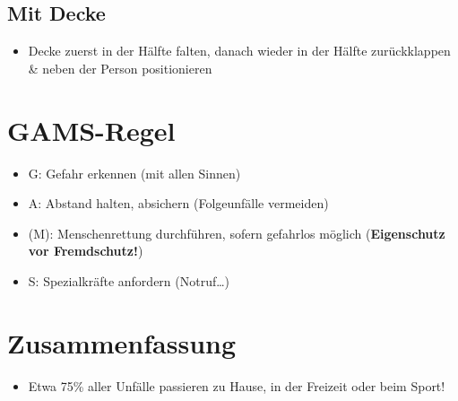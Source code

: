 \subsection*{Mit Decke}
\begin{itemize}
    \item Decke zuerst in der Hälfte falten, danach wieder in der Hälfte zurückklappen \& neben der Person positionieren
\end{itemize}

\section{GAMS-Regel}
\begin{itemize}
    \item  G:  Gefahr erkennen (mit allen Sinnen)
    \item  A:  Abstand halten, absichern (Folgeunfälle vermeiden)
    \item (M): Menschenrettung durchführen, sofern gefahrlos möglich (\textbf{Eigenschutz vor Fremdschutz!})
    \item  S:  Spezialkräfte anfordern (Notruf\dots)
\end{itemize}

\section{Zusammenfassung}
\begin{itemize}
    \item Etwa 75\% aller Unfälle passieren zu Hause, in der Freizeit oder beim Sport!
\end{itemize}